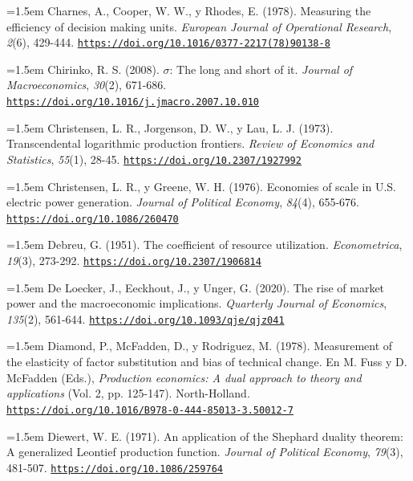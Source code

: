\documentclass[10pt,a4paper]{article}
\begin{document}
\noindent\hangindent=1.5em Charnes, A., Cooper, W. W., y Rhodes, E. (1978). Measuring the efficiency of decision making units. \textit{European Journal of Operational Research}, \textit{2}(6), 429-444. \href{https://doi.org/10.1016/0377-2217(78)90138-8}{\nolinkurl{https://doi.org/10.1016/0377-2217(78)90138-8}}

\noindent\hangindent=1.5em Chirinko, R. S. (2008). $\sigma$: The long and short of it. \textit{Journal of Macroeconomics}, \textit{30}(2), 671-686. \href{https://doi.org/10.1016/j.jmacro.2007.10.010}{\nolinkurl{https://doi.org/10.1016/j.jmacro.2007.10.010}}

\noindent\hangindent=1.5em Christensen, L. R., Jorgenson, D. W., y Lau, L. J. (1973). Transcendental logarithmic production frontiers. \textit{Review of Economics and Statistics}, \textit{55}(1), 28-45. \href{https://doi.org/10.2307/1927992}{\nolinkurl{https://doi.org/10.2307/1927992}}

\noindent\hangindent=1.5em Christensen, L. R., y Greene, W. H. (1976). Economies of scale in U.S. electric power generation. \textit{Journal of Political Economy}, \textit{84}(4), 655-676. \href{https://doi.org/10.1086/260470}{\nolinkurl{https://doi.org/10.1086/260470}}

\noindent\hangindent=1.5em Debreu, G. (1951). The coefficient of resource utilization. \textit{Econometrica}, \textit{19}(3), 273-292. \href{https://doi.org/10.2307/1906814}{\nolinkurl{https://doi.org/10.2307/1906814}}

\noindent\hangindent=1.5em De Loecker, J., Eeckhout, J., y Unger, G. (2020). The rise of market power and the macroeconomic implications. \textit{Quarterly Journal of Economics}, \textit{135}(2), 561-644. \href{https://doi.org/10.1093/qje/qjz041}{\nolinkurl{https://doi.org/10.1093/qje/qjz041}}

\noindent\hangindent=1.5em Diamond, P., McFadden, D., y Rodriguez, M. (1978). Measurement of the elasticity of factor substitution and bias of technical change. En M. Fuss y D. McFadden (Eds.), \textit{Production economics: A dual approach to theory and applications} (Vol. 2, pp. 125-147). North-Holland. \href{https://doi.org/10.1016/B978-0-444-85013-3.50012-7}{\nolinkurl{https://doi.org/10.1016/B978-0-444-85013-3.50012-7}}

\noindent\hangindent=1.5em Diewert, W. E. (1971). An application of the Shephard duality theorem: A generalized Leontief production function. \textit{Journal of Political Economy}, \textit{79}(3), 481-507. \href{https://doi.org/10.1086/259764}{\nolinkurl{https://doi.org/10.1086/259764}}
\end{document}
